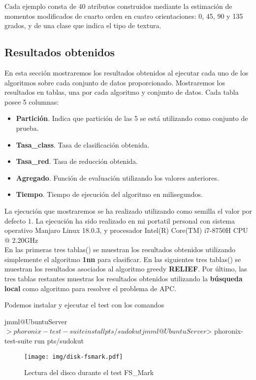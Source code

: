\documentclass[size=a4, parskip=half, titlepage=false, toc=flat, toc=bib, 12pt]{scrartcl}
\begin{document}
Cada ejemplo consta de 40 atributos construidos mediante la estimación de momentos modificados de cuarto orden en cuatro orientaciones: 0, 45, 90 y 135 grados, y de una clase que indica el tipo de textura.

\subsection{Resultados obtenidos}
En esta sección mostraremos los resultados obtenidos al ejecutar cada uno de los algoritmos sobre cada conjunto de datos proporcionado. Mostraremos los resultados en tablas, una por cada algoritmo y conjunto de datos. Cada tabla posee 5 columnas:
\begin{itemize}
    \item \textbf{Partición}. Indica que partición de las 5 se está utilizando como conjunto de prueba.
    \item \textbf{Tasa\_class}. Tasa de clasificación obtenida.
    \item \textbf{Tasa\_red}. Tasa de reducción obtenida.
    \item \textbf{Agregado}. Función de evaluación utilizando los valores anteriores.
    \item \textbf{Tiempo}. Tiempo de ejecución del algoritmo en milisegundos.
\end{itemize}

La ejecución que mostraremos se ha realizado utilizando como semilla el valor por defecto $1$. La ejecución ha sido realizado en mi portatil personal con sistema operativo Manjaro Linux 18.0.3, y procesador Intel(R) Core(TM) i7-8750H CPU @ 2.20GHz\\

En las primeras tres tablas() se muestran los resultados obtenidos utilizando simplemente el algoritmo \textbf{1nn} para clasificar. En las siguientes tres tablas() se muestran los resultados asociados al algoritmo greedy \textbf{RELIEF}. Por último, las tres tablas restantes muestras los resultados obtenidos utilizando la \textbf{búsqueda local} como algoritmo para resolver el problema de APC.

\newpage

Podemos instalar y ejecutar el test con los comandos
\begin{shell}
jmml@UbuntuServer $> phoronix-test-suite install pts/sudokut
jmml@UbuntuServer $> phoronix-test-suite run pts/sudokut
\end{shell}

\begin{figure}[ht]
  \label{fig:disk-fsmark}
  \texttt{[image: img/disk-fsmark.pdf]}
  \caption{Lectura del disco durante el test FS\_Mark}
\end{figure}
\end{document}
